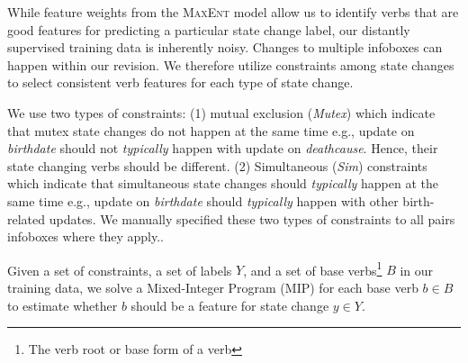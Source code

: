 While feature weights from the \textsc{MaxEnt} model allow us to identify verbs that are good features for predicting a particular state change label, our distantly supervised training data is inherently noisy. Changes to multiple infoboxes can happen within our revision.
We therefore   utilize constraints among state changes to select consistent verb features for each type of state change. 

We use two types of constraints:  (1) mutual exclusion (\textit{Mutex}) which indicate that mutex state changes do not happen at the same time 
e.g., update on \textit{birthdate} should not \textit{typically} happen with update on \textit{deathcause}. Hence,  their state changing verbs should be different. %
(2) Simultaneous (\textit{Sim}) constraints which indicate that simultaneous state changes should \textit{typically} happen at the same time e.g., update on \textit{birthdate} should \textit{typically} happen with other birth-related updates. %
We manually specified these two types  of  constraints to all pairs infoboxes where they apply.. 

Given a set of constraints, a set of labels $Y$, and a set of base verbs\footnote{The verb root or base form of a verb} $B$ in our training data, we solve a Mixed-Integer Program (MIP) for each base verb $b \in B$ to estimate whether $b$ should be a feature for state change $y \in Y$. 


